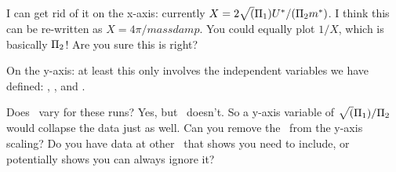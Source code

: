 I can get rid of it on the x-axis: currently
$X = 2\sqrt(\Pi_1)U^{*}/(\Pi_2m^{*})$. I think this can be
re-written as $X = 4\pi/massdamp$. You could equally plot $1/X$, which
is basically $\Pi_2$! Are you sure this is right?

On the y-axis: at least this only involves the independent variables
we have defined: \masstiff, \massdamp, and \mstar.

Does \masstiff\ vary for these runs? Yes, but \mstar\ doesn't. So a y-axis variable of $\sqrt(\Pi_1)/\Pi_2$ would collapse the data just as well. Can you remove the \mstar\ from the y-axis scaling? Do you have data at other \mstar\ that shows you need to include, or potentially shows you can always ignore it?


